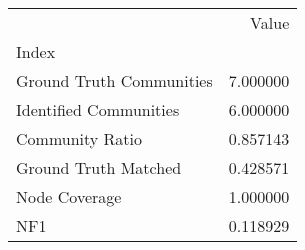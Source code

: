 \begin{tabular}{lr}
\toprule
{} &     Value \\
Index                    &           \\
\midrule
Ground Truth Communities &  7.000000 \\
Identified Communities   &  6.000000 \\
Community Ratio          &  0.857143 \\
Ground Truth Matched     &  0.428571 \\
Node Coverage            &  1.000000 \\
NF1                      &  0.118929 \\
\bottomrule
\end{tabular}
